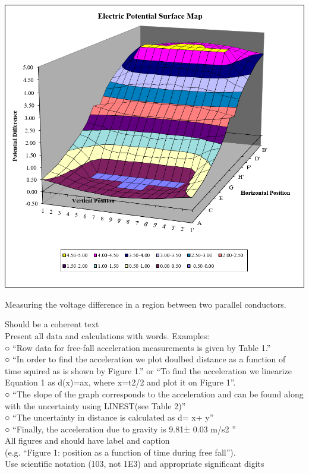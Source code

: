 \documentclass[letterpaper]{article}
\begin{document}
\begin{table}[H]
  \centering
  \includegraphics[width=\textwidth]{chart3.png}
  \caption{Measuring the voltage difference in a region between two parallel conductors.}
\end{table}


Should be a coherent text\\
Present all data and calculations with words. Examples:\\
○ “Row data for free-fall acceleration measurements is given by Table 1.”\\
○ “In order to find the acceleration we plot doulbed distance as a function of
time squired as is shown by Figure 1.” or “To find the acceleration we
linearize Equation 1 as d(x)=ax, where x=t2/2 and plot it on Figure 1”.\\
○ “The slope of the graph corresponds to the acceleration and can be found
along with the uncertainty using LINEST(see Table 2)”\\
○ “The uncertainty in distance is calculated as d= x+ y”\\
○ “Finally, the acceleration due to gravity is 9.81± 0.03 m/s2 ”\\
All figures and should have label and caption \\(e.g. “Figure 1: position as a function
of time during free fall”).\\
Use scientific notation (103, not 1E3) and appropriate significant digits
\end{document}
